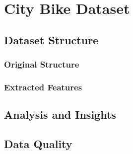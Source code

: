 \section{City Bike Dataset}

\subsection{Dataset Structure}

\subsubsection{Original Structure}
\subsubsection{Extracted Features}

\subsection{Analysis and Insights}

\subsection{Data Quality}

